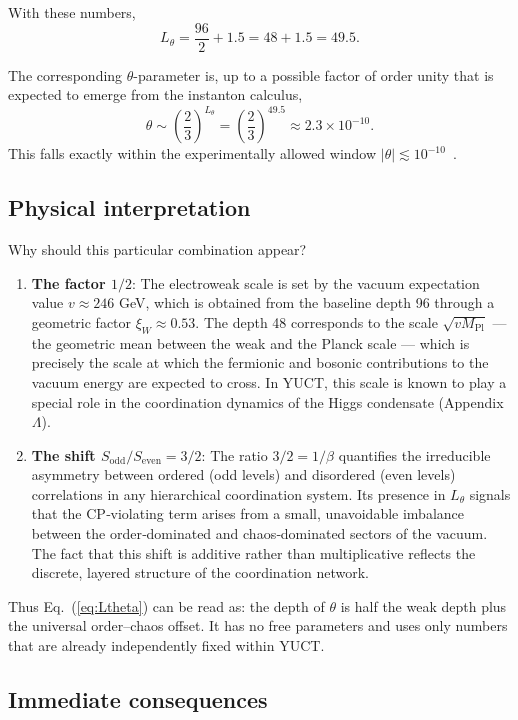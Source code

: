 \documentclass[12pt,a4paper]{article}
\begin{document}
	With these numbers,
	\[
	L_\theta = \frac{96}{2} + 1.5 = 48 + 1.5 = 49.5.
	\]
	
	The corresponding \(\theta\)-parameter is, up to a possible factor of order unity that is expected to emerge from the instanton calculus,
	\[
	\theta \sim \left(\frac{2}{3}\right)^{L_\theta} = \left(\frac{2}{3}\right)^{49.5} \approx 2.3 \times 10^{-10}.
	\]
	This falls exactly within the experimentally allowed window \(|\theta| \lesssim 10^{-10}\)~\cite{nEDM2020}.
	
	\subsection{Physical interpretation}
	
	Why should this particular combination appear?
	\begin{enumerate}
		\item \textbf{The factor \(1/2\)}: The electroweak scale is set by the vacuum expectation value \(v \approx 246\) GeV, which is obtained from the baseline depth 96 through a geometric factor \(\xi_W \approx 0.53\). The depth 48 corresponds to the scale \(\sqrt{v M_{\mathrm{Pl}}}\) — the geometric mean between the weak and the Planck scale — which is precisely the scale at which the fermionic and bosonic contributions to the vacuum energy are expected to cross. In YUCT, this scale is known to play a special role in the coordination dynamics of the Higgs condensate (Appendix~\(\Lambda\)).
		\item \textbf{The shift \(S_{\mathrm{odd}}/S_{\mathrm{even}} = 3/2\)}: The ratio \(3/2 = 1/\beta\) quantifies the irreducible asymmetry between ordered (odd levels) and disordered (even levels) correlations in any hierarchical coordination system. Its presence in \(L_\theta\) signals that the CP‑violating term arises from a small, unavoidable imbalance between the order‑dominated and chaos‑dominated sectors of the vacuum. The fact that this shift is additive rather than multiplicative reflects the discrete, layered structure of the coordination network.
	\end{enumerate}
	
	Thus Eq.~(\ref{eq:Ltheta}) can be read as: the depth of \(\theta\) is half the weak depth plus the universal order–chaos offset. It has no free parameters and uses only numbers that are already independently fixed within YUCT.
	
	\subsection{Immediate consequences}
	
\end{document}
